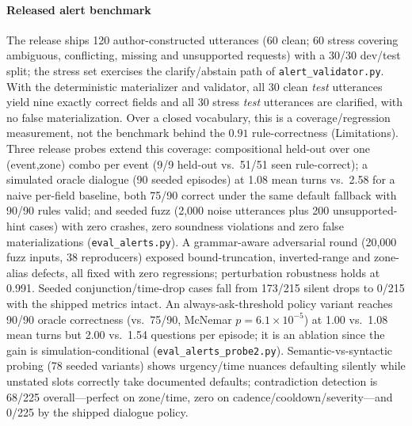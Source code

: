 ﻿\documentclass[conference]{IEEEtran}
\theoremstyle{plain}
\begin{document}
\paragraph*{Released alert benchmark} The release ships 120 author-constructed utterances (60 clean; 60 stress covering ambiguous, conflicting, missing and unsupported requests) with a 30/30 dev/test split; the stress set exercises the clarify/abstain path of \texttt{alert\_\allowbreak validator.py}. With the deterministic materializer and validator, all 30 clean \emph{test} utterances yield nine exactly correct fields and all 30 stress \emph{test} utterances are clarified, with no false materialization. Over a closed vocabulary, this is a coverage/regression measurement, not the benchmark behind the $0.91$ rule-correctness (Limitations). Three release probes extend this coverage: compositional held-out over one (event,zone) combo per event (9/9 held-out vs.\ 51/51 seen rule-correct); a simulated oracle dialogue (90 seeded episodes) at 1.08 mean turns vs.\ 2.58 for a naive per-field baseline, both 75/90 correct under the same default fallback with 90/90 rules valid; and seeded fuzz (2{,}000 noise utterances plus 200 unsupported-hint cases) with zero crashes, zero soundness violations and zero false materializations (\texttt{eval\_\allowbreak alerts.py}). A grammar-aware adversarial round (20{,}000 fuzz inputs, 38 reproducers) exposed bound-truncation, inverted-range and zone-alias defects, all fixed with zero regressions; perturbation robustness holds at 0.991. Seeded conjunction/time-drop cases fall from 173/215 silent drops to 0/215 with the shipped metrics intact. An always-ask-threshold policy variant reaches 90/90 oracle correctness (vs.\ 75/90, McNemar $p{=}6.1{\times}10^{-5}$) at 1.00 vs.\ 1.08 mean turns but 2.00 vs.\ 1.54 questions per episode; it is an ablation since the gain is simulation-conditional (\texttt{eval\_\allowbreak alerts\_probe2.py}). Semantic-vs-syntactic probing (78 seeded variants) shows urgency/time nuances defaulting silently while unstated slots correctly take documented defaults; contradiction detection is 68/225 overall---perfect on zone/time, zero on cadence/cooldown/severity---and 0/225 by the shipped dialogue policy.
\end{document}
